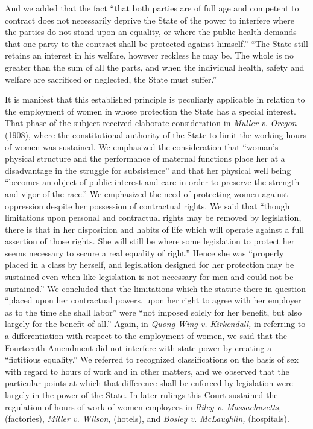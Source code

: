 \documentclass[
  letterpaper,
  11pt,
  DIV=9,
  openright]{scrbook}
\begin{document}
And we added that the fact ``that both parties are of full age and
competent to contract does not necessarily deprive the State of the
power to interfere where the parties do not stand upon an equality, or
where the public health demands that one party to the contract shall be
protected against himself.'' ``The State still retains an interest in
his welfare, however reckless he may be. The whole is no greater than
the sum of all the parts, and when the individual health, safety and
welfare are sacrificed or neglected, the State must suffer.''

It is manifest that this established principle is peculiarly applicable
in relation to the employment of women in whose protection the State has
a special interest. That phase of the subject received elaborate
consideration in \emph{Muller v. Oregon} (1908), where the
constitutional authority of the State to limit the working hours of
women was sustained. We emphasized the consideration that ``woman's
physical structure and the performance of maternal functions place her
at a disadvantage in the struggle for subsistence'' and that her
physical well being ``becomes an object of public interest and care in
order to preserve the strength and vigor of the race.'' We emphasized
the need of protecting women against oppression despite her possession
of contractual rights. We said that ``though limitations upon personal
and contractual rights may be removed by legislation, there is that in
her disposition and habits of life which will operate against a full
assertion of those rights. She will still be where some legislation to
protect her seems necessary to secure a real equality of right.'' Hence
she was ``properly placed in a class by herself, and legislation
designed for her protection may be sustained even when like legislation
is not necessary for men and could not be sustained.'' We concluded that
the limitations which the statute there in question ``placed upon her
contractual powers, upon her right to agree with her employer as to the
time she shall labor'' were ``not imposed solely for her benefit, but
also largely for the benefit of all.'' Again, in \emph{Quong Wing v.
Kirkendall,} in referring to a differentiation with respect to the
employment of women, we said that the Fourteenth Amendment did not
interfere with state power by creating a ``fictitious equality.'' We
referred to recognized classifications on the basis of sex with regard
to hours of work and in other matters, and we observed that the
particular points at which that difference shall be enforced by
legislation were largely in the power of the State. In later rulings
this Court sustained the regulation of hours of work of women employees
in \emph{Riley v. Massachusetts,} (factories), \emph{Miller v. Wilson,}
(hotels), and \emph{Bosley v. McLaughlin,} (hospitals).
\end{document}
